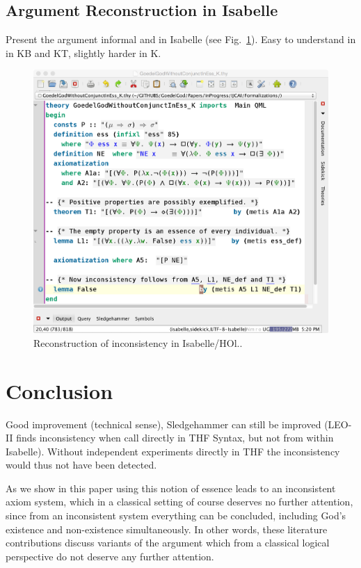 \documentclass{article}
\begin{document}
\subsection{Argument Reconstruction in Isabelle}
Present the argument informal and in Isabelle (see
Fig.~\ref{InconsistencyIsabelleK}). Easy to understand in 
in KB and KT, slightly harder in K.
\begin{figure}
\centerline{\includegraphics[width=\columnwidth]{./Images/InconsistencyIsabelleK.png}}
\caption{Reconstruction of inconsistency in Isabelle/HOl..} \label{InconsistencyIsabelleK}
\end{figure}





\section{Conclusion}


Good improvement (technical sense), Sledgehammer can still be improved
(LEO-II finds inconsistency when call directly in THF Syntax, but not
from within Isabelle). Without independent experiments directly in THF 
the inconsistency would thus not have been detected.


As we show in this paper using this notion of essence
leads to an inconsistent axiom system, which in a classical setting of
course deserves no further attention, since from an inconsistent
system everything can be concluded, including God's existence and
non-existence simultaneously. In other words, these literature
contributions discuss variants of the argument which from a classical
logical perspective do not deserve any further attention.
\end{document}
